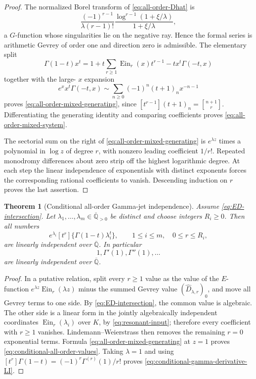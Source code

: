 \documentclass[11pt]{article}
\newtheorem{theorem}{Theorem}[section]
\theoremstyle{definition}
\theoremstyle{remark}
\newcommand{\Qbar}{\overline{\mathbb Q}}
\newcommand{\Ein}{\operatorname{Ein}}
\newcommand{\stirling}[2]{\genfrac{[}{]}{0pt}{}{#1}{#2}}
\begin{document}
\begin{proof}
The normalized Borel transform of \eqref{eq:all-order-Dhat} is
\[
 \frac{(-1)^{r-1}}{\lambda(r-1)!}
 \frac{\log^{r-1}(1+\xi/\lambda)}{1+\xi/\lambda},
\]
a \(G\)-function whose singularities lie on the negative ray.  Hence the
formal series is arithmetic Gevrey of order one and direction zero is
admissible.  The elementary split
\[
 \Gamma(1-t)x^t
 =1+t\sum_{r\ge1}\Ein_r(x)t^{r-1}
   -t x^t\Gamma(-t,x)
\]
together with the large-
\(x\) expansion
\[
 e^x x^t\Gamma(-t,x)
 \sim\sum_{n\ge0}(-1)^n(t+1)_n x^{-n-1}
\]
proves \eqref{eq:all-order-mixed-generating}, since
\([t^{r-1}](t+1)_n=\stirling{n+1}{r}\).  Differentiating the generating
identity and comparing coefficients proves
\eqref{eq:all-order-mixed-system}.

The sectorial sum on the right of
\eqref{eq:all-order-mixed-generating} is \(e^{\lambda z}\) times a
polynomial in \(\log z\) of degree \(r\), with nonzero leading coefficient
\(1/r!\).  Repeated monodromy differences about zero strip off the highest
logarithmic degree.  At each step the linear independence of exponentials
with distinct exponents forces the corresponding rational coefficients to
vanish.  Descending induction on \(r\) proves the last assertion.
\end{proof}

\begin{theorem}[Conditional all-order Gamma-jet independence]
\label{thm:conditional-all-order-gamma}
Assume \eqref{eq:ED-intersection}.  Let
\(\lambda_1,\ldots,\lambda_m\in\Qbar_{>0}\) be distinct and choose
integers \(R_i\ge0\).  Then all numbers
\begin{equation}\label{eq:conditional-all-order-values}
 \boxed{\displaystyle
 e^{\lambda_i}[t^r]\{\Gamma(1-t)\lambda_i^t\},
 \qquad 1\le i\le m,\quad0\le r\le R_i,}
\end{equation}
are linearly independent over \(\Qbar\).  In particular
\begin{equation}\label{eq:conditional-gamma-derivative-LI}
 \boxed{1,\Gamma'(1),\Gamma''(1),\ldots}
\end{equation}
are linearly independent over \(\Qbar\).
\end{theorem}

\begin{proof}
In a putative relation, split every \(r\ge1\) value as the value of the
\(E\)-function \(e^{\lambda z}\Ein_r(\lambda z)\) minus the summed
Gevrey value \((\widehat D_{\lambda,r})_0\), and move all Gevrey terms to
one side.  By \eqref{eq:ED-intersection}, the common value is algebraic.
The other side is a linear form in the jointly algebraically independent
coordinates \(\Ein_r(\lambda_i)\) over \(K\), by
\eqref{eq:resonant-input}; therefore every coefficient with \(r\ge1\)
vanishes.  Lindemann--Weierstrass then removes the remaining \(r=0\)
exponential terms.  Formula \eqref{eq:all-order-mixed-generating} at
\(z=1\) proves \eqref{eq:conditional-all-order-values}.  Taking
\(\lambda=1\) and using
\([t^r]\Gamma(1-t)=(-1)^r\Gamma^{(r)}(1)/r!\) proves
\eqref{eq:conditional-gamma-derivative-LI}.
\end{proof}
\end{document}
